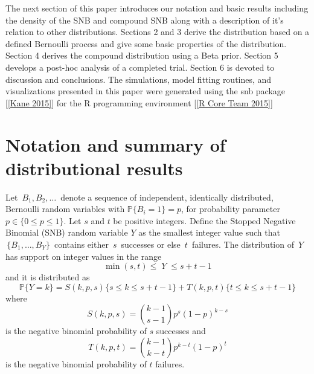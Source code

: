 \documentclass[12pt]{article}         %
\begin{document}
The next section of this paper introduces our notation and basic results including the density of the SNB and compound SNB along with a description of it's relation to other distributions. Sections 2 and 3 derive the distribution based on a defined Bernoulli process and give some basic properties of the distribution. Section 4 derives the compound distribution using a Beta prior. Section 5 develops a post-hoc analysis of a completed trial. Section 6 is devoted to discussion and conclusions. The simulations, model fitting routines, and visualizations presented in this paper were generated using the snb package [\ref{Kane 2015}] for the R programming environment [\ref{R Core Team 2015}]



\section   {Notation and summary of distributional results}
\label{notation.section}

Let $\,B_1, B_2, \ldots \,$ denote a sequence of independent, identically distributed, Bernoulli random variables with 
$\mathbb{P}\{B_i=1\}=p$, for probability parameter $p \in \{0\leq p\leq 1\}$. Let $s$ and $t$ be positive integers. Define the Stopped Negative Binomial (SNB) random variable $Y$ as the smallest integer value such that $\,\{B_1, \ldots , B_Y\}\,$ contains either $\,s\,$ successes or else $\,t\,$ failures. The distribution of $\,Y\,$ has support on integer values in the range 
\begin{equation*}                                     %
     \min(s,t) \leq \; Y \;\leq s+t-1  \label{range.y.eq}
\end{equation*}
and it is distributed as
\begin{equation} \label{eqn:pmf}
\mathbb{P}\{Y=k\} = S(k, p, s)  \{s \leq k \leq s+t-1\} + T(k, p, t) \{t \leq k \leq s+t-1 \} 
\end{equation}
where
\begin{equation} \label{eqn:N}
S(k, p, s) = {k-1 \choose s-1} p^s (1-p)^{k-s} 
\end{equation}
is the negative binomial probability of $s$ successes and
\begin{equation} \label{eqn:R}
T(k, p, t) = {k-1 \choose k-t} p^{k-t} (1-p)^t
\end{equation}
is the negative binomial probability of $t$ failures.
\end{document}
